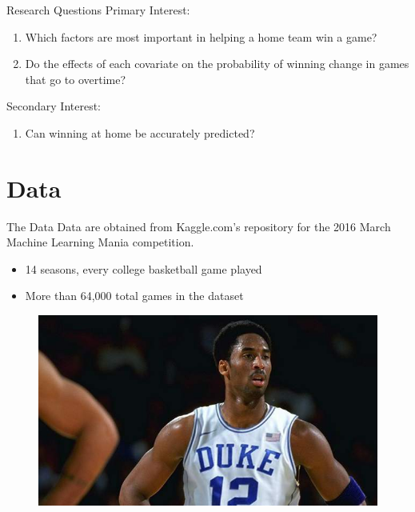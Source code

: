 \documentclass{beamer}
\begin{document}
\begin{frame}{Research Questions}
Primary Interest:
\begin{enumerate}
	\item %
	Which factors are most important in helping a home team win a game?
	\item %
	Do the effects of each covariate on the probability of winning change in games that go to overtime?
\end{enumerate}
Secondary Interest:
\begin{enumerate} \addtocounter{enumi}{2}
	\item %
	Can winning at home be accurately predicted?
\end{enumerate}
	
\end{frame}

	
\section{Data}
\begin{frame}{The Data}
	Data are obtained from Kaggle.com's repository for the 2016 March Machine Learning Mania competition. %
		\\
		\begin{itemize}
			\item 14 seasons, every college basketball game played
			\item More than 64,000 total games in the dataset  
						
		\end{itemize}
	
	\begin{figure}
		\includegraphics[width = 200 pt]{fakekobe.jpg}
	\end{figure}
	
\end{frame}
\end{document}
